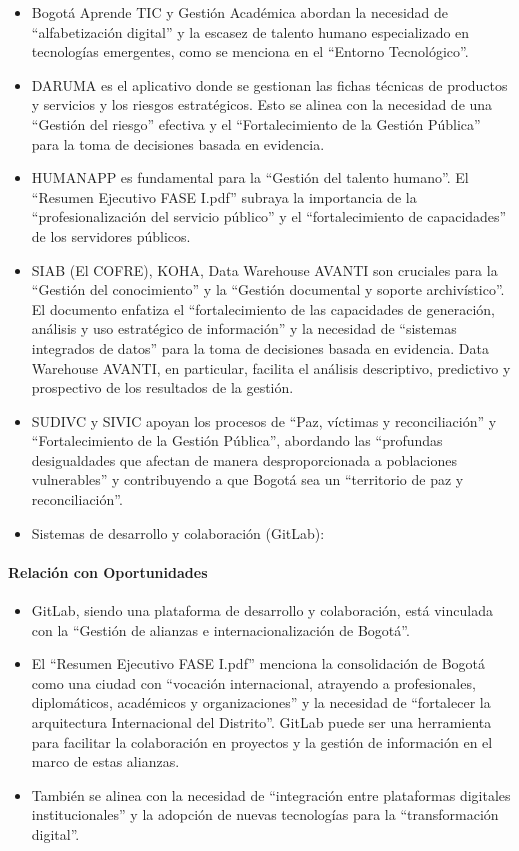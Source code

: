 \documentclass[
	a4paper, %
	12pt, %
]{include/CSSullivanBusinessReport}
\def\tightlist{}
\begin{document}
\begin{itemize}
\item
  Bogotá Aprende TIC y Gestión Académica abordan la necesidad de
  ``alfabetización digital'' y la escasez de talento humano
  especializado en tecnologías emergentes, como se menciona en el
  ``Entorno Tecnológico''.
\item
  DARUMA es el aplicativo donde se gestionan las fichas técnicas de
  productos y servicios y los riesgos estratégicos. Esto se alinea con
  la necesidad de una ``Gestión del riesgo'' efectiva y el
  ``Fortalecimiento de la Gestión Pública'' para la toma de decisiones
  basada en evidencia.
\item
  HUMANAPP es fundamental para la ``Gestión del talento humano''. El
  ``Resumen Ejecutivo FASE I.pdf'' subraya la importancia de la
  ``profesionalización del servicio público'' y el ``fortalecimiento de
  capacidades'' de los servidores públicos.
\item
  SIAB (El COFRE), KOHA, Data Warehouse AVANTI son cruciales para la
  ``Gestión del conocimiento'' y la ``Gestión documental y soporte
  archivístico''. El documento enfatiza el ``fortalecimiento de las
  capacidades de generación, análisis y uso estratégico de información''
  y la necesidad de ``sistemas integrados de datos'' para la toma de
  decisiones basada en evidencia. Data Warehouse AVANTI, en particular,
  facilita el análisis descriptivo, predictivo y prospectivo de los
  resultados de la gestión.
\item
  SUDIVC y SIVIC apoyan los procesos de ``Paz, víctimas y
  reconciliación'' y ``Fortalecimiento de la Gestión Pública'',
  abordando las ``profundas desigualdades que afectan de manera
  desproporcionada a poblaciones vulnerables'' y contribuyendo a que
  Bogotá sea un ``territorio de paz y reconciliación''.
\item
  Sistemas de desarrollo y colaboración (GitLab):
\end{itemize}

\paragraph{Relación con
Oportunidades}\label{sec:relaciuxf3n-con-oportunidades}

\begin{itemize}
\tightlist
\item
  GitLab, siendo una plataforma de desarrollo y colaboración, está
  vinculada con la ``Gestión de alianzas e internacionalización de
  Bogotá''.
\item
  El ``Resumen Ejecutivo FASE I.pdf'' menciona la consolidación de
  Bogotá como una ciudad con ``vocación internacional, atrayendo a
  profesionales, diplomáticos, académicos y organizaciones'' y la
  necesidad de ``fortalecer la arquitectura Internacional del
  Distrito''. GitLab puede ser una herramienta para facilitar la
  colaboración en proyectos y la gestión de información en el marco de
  estas alianzas.
\item
  También se alinea con la necesidad de ``integración entre plataformas
  digitales institucionales'' y la adopción de nuevas tecnologías para
  la ``transformación digital''.
\end{itemize}
\end{document}
